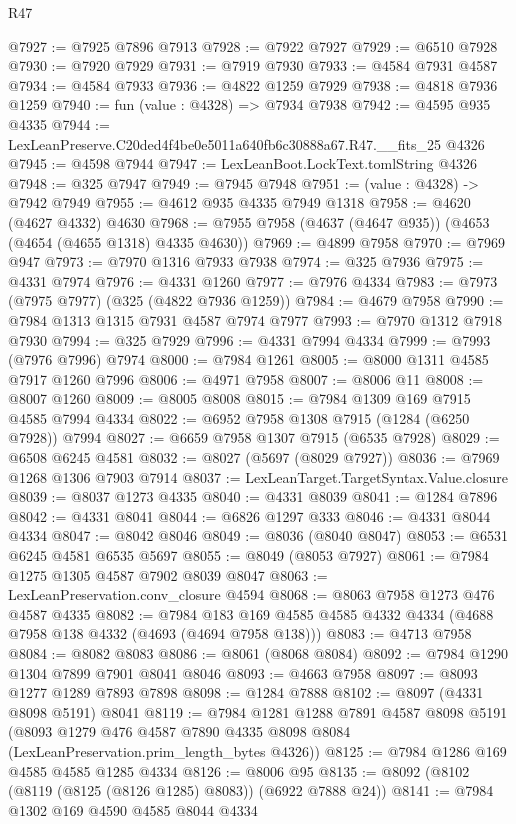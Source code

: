 \begin{lexlean}{R47}
\begin{coremodule}
@7927 := @7925 @7896 @7913
@7928 := @7922 @7927
@7929 := @6510 @7928
@7930 := @7920 @7929
@7931 := @7919 @7930
@7933 := @4584 @7931 @4587
@7934 := @4584 @7933
@7936 := @4822 @1259 @7929
@7938 := @4818 @7936 @1259
@7940 := fun (value : @4328) => @7934 @7938
@7942 := @4595 @935 @4335
@7944 := LexLeanPreserve.C20ded4f4be0e5011a640fb6c30888a67.R47.__fits_25 @4326
@7945 := @4598 @7944
@7947 := LexLeanBoot.LockText.tomlString @4326
@7948 := @325 @7947
@7949 := @7945 @7948
@7951 := (value : @4328) -> @7942 @7949
@7955 := @4612 @935 @4335 @7949 @1318
@7958 := @4620 (@4627 @4332) @4630
@7968 := @7955 @7958 (@4637 (@4647 @935)) (@4653 (@4654 (@4655 @1318) @4335 @4630))
@7969 := @4899 @7958
@7970 := @7969 @947
@7973 := @7970 @1316 @7933 @7938
@7974 := @325 @7936
@7975 := @4331 @7974
@7976 := @4331 @1260
@7977 := @7976 @4334
@7983 := @7973 (@7975 @7977) (@325 (@4822 @7936 @1259))
@7984 := @4679 @7958
@7990 := @7984 @1313 @1315 @7931 @4587 @7974 @7977
@7993 := @7970 @1312 @7918 @7930
@7994 := @325 @7929
@7996 := @4331 @7994 @4334
@7999 := @7993 (@7976 @7996) @7974
@8000 := @7984 @1261
@8005 := @8000 @1311 @4585 @7917 @1260 @7996
@8006 := @4971 @7958
@8007 := @8006 @11
@8008 := @8007 @1260
@8009 := @8005 @8008
@8015 := @7984 @1309 @169 @7915 @4585 @7994 @4334
@8022 := @6952 @7958 @1308 @7915 (@1284 (@6250 @7928)) @7994
@8027 := @6659 @7958 @1307 @7915 (@6535 @7928)
@8029 := @6508 @6245 @4581
@8032 := @8027 (@5697 (@8029 @7927))
@8036 := @7969 @1268 @1306 @7903 @7914
@8037 := LexLeanTarget.TargetSyntax.Value.closure
@8039 := @8037 @1273 @4335
@8040 := @4331 @8039
@8041 := @1284 @7896
@8042 := @4331 @8041
@8044 := @6826 @1297 @333
@8046 := @4331 @8044 @4334
@8047 := @8042 @8046
@8049 := @8036 (@8040 @8047)
@8053 := @6531 @6245 @4581 @6535 @5697
@8055 := @8049 (@8053 @7927)
@8061 := @7984 @1275 @1305 @4587 @7902 @8039 @8047
@8063 := LexLeanPreservation.conv_closure @4594
@8068 := @8063 @7958 @1273 @476 @4587 @4335
@8082 := @7984 @183 @169 @4585 @4585 @4332 @4334 (@4688 @7958 @138 @4332 (@4693 (@4694 @7958 @138)))
@8083 := @4713 @7958
@8084 := @8082 @8083
@8086 := @8061 (@8068 @8084)
@8092 := @7984 @1290 @1304 @7899 @7901 @8041 @8046
@8093 := @4663 @7958
@8097 := @8093 @1277 @1289 @7893 @7898
@8098 := @1284 @7888
@8102 := @8097 (@4331 @8098 @5191) @8041
@8119 := @7984
    @1281
    @1288
    @7891
    @4587
    @8098
    @5191
    (@8093 @1279 @476 @4587 @7890 @4335 @8098 @8084 (LexLeanPreservation.prim_length_bytes @4326))
@8125 := @7984 @1286 @169 @4585 @4585 @1285 @4334
@8126 := @8006 @95
@8135 := @8092 (@8102 (@8119 (@8125 (@8126 @1285) @8083)) (@6922 @7888 @24))
@8141 := @7984 @1302 @169 @4590 @4585 @8044 @4334

\end{coremodule}
\end{lexlean}

